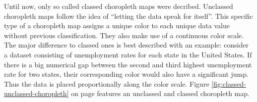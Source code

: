 Until now, only so called classed choropleth maps were decribed. Unclassed choropleth maps follow the idea of ``letting the data speak for itself''. This specific type of a choropleth map assigns a unique color to each unique data value without previous classification. They also make use of a continuous color scale. The major difference to classed ones is best described with an example: consider a dataset consisting of unemployment rates for each state in the United States. If there is a big numerical gap between the second and third highest unemployment rate for two states, their corresponding color would also have a significant jump. Thus the data is placed proportionally along the color scale. Figure \ref{fig:classed-unclassed-choropleth} on page \pageref{fig:classed-unclassed-choropleth} features an unclassed and classed choropleth map.

